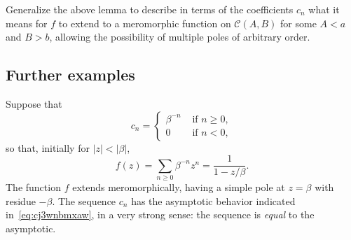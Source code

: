 \documentclass[reqno]{amsart}  \numberwithin{theorem}{section} \numberwithin{equation}{section}
\begin{document}
\begin{exercise}
  Generalize the above lemma to describe in terms of the coefficients $c_n$ what it means for $f$ to extend to a meromorphic function on $\mathcal{C}(A,B)$ for some $A < a$ and $B > b$, allowing the possibility of multiple poles of arbitrary order.
\end{exercise}

\subsection{Further examples}\label{sec:cj4unj3scf}


\begin{example}
  Suppose that
  \begin{equation*}
    c_n =
    \begin{cases}
      \beta^{- n} & \text{ if } n \geq 0, \\
      0 & \text{ if } n < 0,
    \end{cases}
  \end{equation*}
  so that, initially for $\lvert z \rvert < |\beta|$,
  \begin{equation*}
    f (z) = \sum_{n \geq 0} \beta^{-n} z^n = \frac{1}{1 - z / \beta }.
  \end{equation*}
  The function $f$ extends meromorphically, having a simple pole at $z = \beta$ with residue $-\beta$.  The sequence $c_n$ has the asymptotic behavior indicated in~\eqref{eq:cj3wnbmxaw}, in a very strong sense: the sequence is \emph{equal} to the asymptotic.
\end{example}
\end{document}
